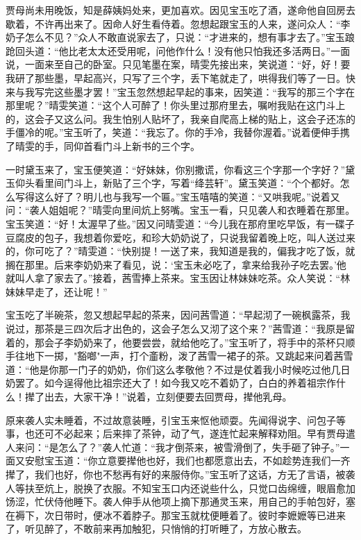\documentclass[12pt,oneside]{book}
\begin{document}
贾母尚未用晚饭，知是薛姨妈处来，更加喜欢。因见宝玉吃了酒，遂命他自回房去歇着，不许再出来了。因命人好生看侍着。忽想起跟宝玉的人来，遂问众人：“李奶子怎么不见？”众人不敢直说家去了，只说：“才进来的，想有事才去了。”宝玉踉跄回头道：“他比老太太还受用呢，问他作什么！没有他只怕我还多活两日。”一面说，一面来至自己的卧室。只见笔墨在案，晴雯先接出来，笑说道：“好，好！要我研了那些墨，早起高兴，只写了三个字，丢下笔就走了，哄得我们等了一日。快来与我写完这些墨才罢！”宝玉忽然想起早起的事来，因笑道：“我写的那三个字在那里呢？”晴雯笑道：“这个人可醉了！你头里过那府里去，嘱咐我贴在这门斗上的，这会子又这么问。我生怕别人贴坏了，我亲自爬高上梯的贴上，这会子还冻的手僵冷的呢。”宝玉听了，笑道：“我忘了。你的手冷，我替你渥着。”说着便伸手携了晴雯的手，同仰首看门斗上新书的三个字。

一时黛玉来了，宝玉便笑道：“好妹妹，你别撒谎，你看这三个字那一个字好？”黛玉仰头看里间门斗上，新贴了三个字，写着“绛芸轩”。黛玉笑道：“个个都好。怎么写得这么好了？明儿也与我写一个匾。”宝玉嘻嘻的笑道：“又哄我呢。”说着又问：“袭人姐姐呢？”晴雯向里间炕上努嘴。宝玉一看，只见袭人和衣睡着在那里。宝玉笑道：“好！太渥早了些。”因又问晴雯道：“今儿我在那府里吃早饭，有一碟子豆腐皮的包子，我想着你爱吃，和珍大奶奶说了，只说我留着晚上吃，叫人送过来的，你可吃了？”晴雯道：“快别提！一送了来，我知道是我的，偏我才吃了饭，就搁在那里。后来李奶奶来了看见，说：‘宝玉未必吃了，拿来给我孙子吃去罢。’他就叫人拿了家去了。”接着，茜雪捧上茶来。宝玉因让林妹妹吃茶。众人笑说：“林妹妹早走了，还让呢！”

宝玉吃了半碗茶，忽又想起早起的茶来，因问茜雪道：“早起沏了一碗枫露茶，我说过，那茶是三四次后才出色的，这会子怎么又沏了这个来？”茜雪道：“我原是留着的，那会子李奶奶来了，他要尝尝，就给他吃了。”宝玉听了，将手中的茶杯只顺手往地下一掷，"豁啷"一声，打个齑粉，泼了茜雪一裙子的茶。又跳起来问着茜雪道：“他是你那一门子的奶奶，你们这么孝敬他？不过是仗着我小时候吃过他几日奶罢了。如今逞得他比祖宗还大了！如今我又吃不着奶了，白白的养着祖宗作什么！撵了出去，大家干净！”说着，立刻便要去回贾母，撵他乳母。

原来袭人实未睡着，不过故意装睡，引宝玉来怄他顽耍。先闻得说字、问包子等事，也还可不必起来；后来摔了茶钟，动了气，遂连忙起来解释劝阻。早有贾母遣人来问：“是怎么了？”袭人忙道：“我才倒茶来，被雪滑倒了，失手砸了钟子。”一面又安慰宝玉道：“你立意要撵他也好，我们也都愿意出去，不如趁势连我们一齐撵了，我们也好，你也不愁再有好的来服侍你。”宝玉听了这话，方无了言语，被袭人等扶至炕上，脱换了衣服。不知宝玉口内还说些什么，只觉口齿绵缠，眼眉愈加饧涩，忙伏侍他睡下。袭人伸手从他项上摘下那通灵玉来，用自己的手帕包好，塞在褥下，次日带时，便冰不着脖子。那宝玉就枕便睡着了。彼时李嬷嬷等已进来了，听见醉了，不敢前来再加触犯，只悄悄的打听睡了，方放心散去。
\end{document}

